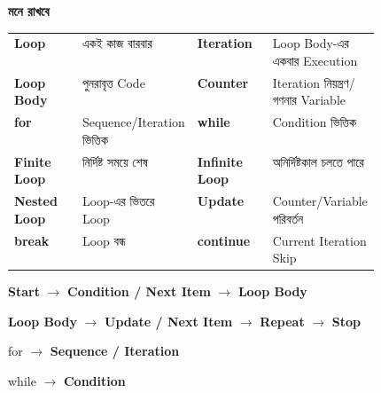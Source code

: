 \begin{rememberbox}

\textbf{\color{deepOrange}মনে রাখবে}

\begin{tabularx}
{\linewidth}
{
>{\bfseries\RaggedRight\arraybackslash}p{0.24\linewidth}
Y
>{\bfseries\RaggedRight\arraybackslash}p{0.24\linewidth}
Y
}

Loop
&
একই কাজ বারবার
&
Iteration
&
Loop Body-এর একবার Execution
\\[0.7mm]

Loop Body
&
পুনরাবৃত্ত Code
&
Counter
&
Iteration নিয়ন্ত্রণ/গণনার Variable
\\[0.7mm]

\textenglish{\ttfamily for}
&
Sequence/Iteration ভিত্তিক
&
\textenglish{\ttfamily while}
&
Condition ভিত্তিক
\\[0.7mm]

Finite Loop
&
নির্দিষ্ট সময়ে শেষ
&
Infinite Loop
&
অনির্দিষ্টকাল চলতে পারে
\\[0.7mm]

Nested Loop
&
Loop-এর ভিতরে Loop
&
Update
&
Counter/Variable পরিবর্তন
\\[0.7mm]

\textenglish{\ttfamily break}
&
Loop বন্ধ
&
\textenglish{\ttfamily continue}
&
Current Iteration Skip
\\

\end{tabularx}

\medskip

\begin{center}

\textbf{Start}
\(\longrightarrow\)
\textbf{Condition / Next Item}
\(\longrightarrow\)
\textbf{Loop Body}

\medskip

\textbf{Loop Body}
\(\longrightarrow\)
\textbf{Update / Next Item}
\(\longrightarrow\)
\textbf{Repeat}
\(\longrightarrow\)
\textbf{Stop}

\medskip

\textenglish{\ttfamily for}
\(\longrightarrow\)
\textbf{Sequence / Iteration}

\qquad

\textenglish{\ttfamily while}
\(\longrightarrow\)
\textbf{Condition}

\end{center}

\end{rememberbox}

\small


